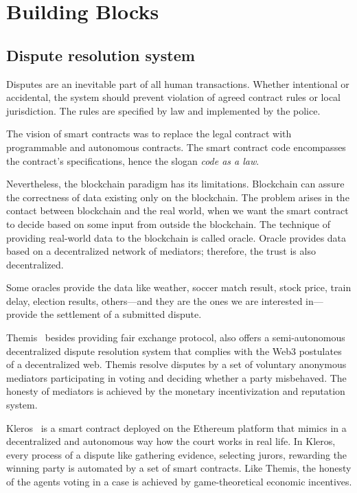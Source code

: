 \documentclass{ieeeaccess}
\begin{document}
\section{Building Blocks}\label{sec:building-blocks}
\subsection{Dispute resolution system}

Disputes are an inevitable part of all human transactions. Whether intentional or accidental, the system should prevent violation of agreed contract rules or local jurisdiction. The rules are specified by law and implemented by the police.

The vision of smart contracts was to replace the legal contract with
programmable and autonomous contracts. The smart contract code encompasses the contract's specifications, hence the slogan \textit{code as a law}. 

Nevertheless, the blockchain paradigm has its limitations. Blockchain can assure the correctness of data existing only on the blockchain. The problem arises in the contact between blockchain and the real world, when we want the smart contract to decide based on some input from outside the blockchain. The technique of providing real-world data to the blockchain is called oracle. Oracle provides data based on a decentralized network of mediators; therefore, the trust is also decentralized.

Some oracles provide the data like weather, soccer match result, stock
price, train delay, election results, others—and they are the ones we
are interested in—provide the settlement of a submitted dispute.

Themis~\cite{mengThemisDecentralizedEscrow2019} besides providing fair exchange protocol,
also offers a semi-autonomous decentralized dispute resolution system that complies with the Web3 postulates of a decentralized web. Themis
resolve disputes by a set of voluntary anonymous mediators participating
in voting and deciding whether a party misbehaved. The honesty of
mediators is achieved by the monetary incentivization and reputation
system.

Kleros~\cite{bergollaKlerosSociolegalCase2022} is a smart contract deployed on the Ethereum platform that mimics in a decentralized and autonomous way how the court works in real life. In Kleros, every process of a dispute like gathering evidence, selecting jurors, rewarding the winning party is automated by a set of smart contracts. Like Themis, the honesty of the agents voting in a case is achieved by game-theoretical economic incentives.
\end{document}
